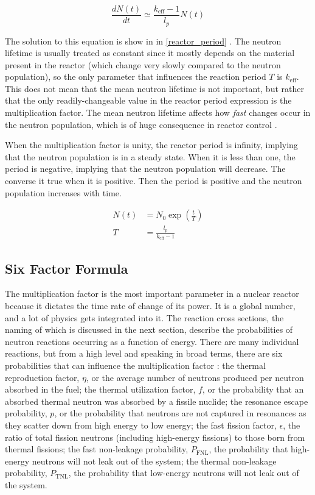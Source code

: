 \begin{equation}
\label{point_kin2}
\frac{dN(t)}{dt} \simeq \frac{k_\mathrm{eff} -1}{l_p}N(t)
\end{equation}

The solution to this equation is show in in \eqref{reactor_period} \cite{duderstadt}.  The neutron lifetime is usually treated as constant since it mostly depends on the material present in the reactor (which change very slowly compared to the neutron population), so the only parameter that influences the reaction period $T$ is $k_\mathrm{eff}$.  This does not mean that the mean neutron lifetime is not important, but rather that the only readily-changeable value in the reactor period expression is the multiplication factor.  The mean neutron lifetime affects how \emph{fast} changes occur in the neutron population, which is of huge consequence in reactor control \cite{duderstadt}.  

When the multiplication factor is unity, the reactor period is infinity, implying that the neutron population is in a steady state.  When it is less than one, the period is negative, implying that the neutron population will decrease.  The converse it true when it is positive.  Then the period is positive and the neutron population increases with time.

\begin{equation}
\label{reactor_period}
\begin{split}
N(t) &= N_0 \exp \left( \frac{t}{T} \right) \\
T &= \frac{l_p}{k_\mathrm{eff} -1}
\end{split}
\end{equation}

\subsection{Six Factor Formula}

The multiplication factor is the most important parameter in a nuclear reactor because it dictates the time rate of change of its power.  It is a global number, and a lot of physics gets integrated into it.   The reaction cross sections, the naming of which is discussed in the next section, describe the probabilities of neutron reactions occurring as a function of energy.  There are many individual reactions, but from a high level and speaking in broad terms, there are six probabilities that can influence the multiplication factor \cite{duderstadt}: 
the thermal reproduction factor, $\eta$, or the average number of neutrons produced per neutron absorbed in the fuel;
the thermal utilization factor, $f$, or the probability that an absorbed thermal neutron was absorbed by a fissile nuclide;
the resonance escape probability, $p$, or the probability that neutrons are not captured in resonances as they scatter down from high energy to low energy; 
the fast fission factor, $\epsilon$, the ratio of total fission neutrons (including high-energy fissions) to those born from thermal fissions;
the fast non-leakage probability, $P_\mathrm{FNL}$, the probability that high-energy neutrons will not leak out of the system;
the thermal non-leakage probability, $P_\mathrm{TNL}$, the probability that low-energy neutrons will not leak out of the system.

